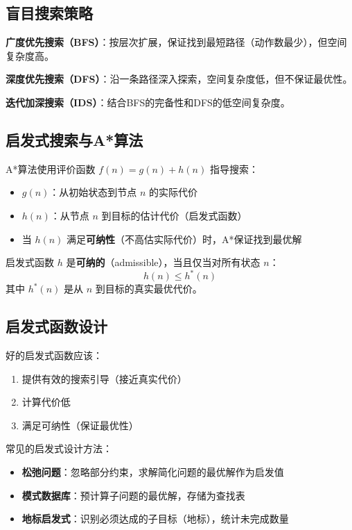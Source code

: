 \subsection{盲目搜索策略}

\textbf{广度优先搜索（BFS）}：按层次扩展，保证找到最短路径（动作数最少），但空间复杂度高。

\textbf{深度优先搜索（DFS）}：沿一条路径深入探索，空间复杂度低，但不保证最优性。

\textbf{迭代加深搜索（IDS）}：结合BFS的完备性和DFS的低空间复杂度。

\subsection{启发式搜索与A*算法}

\begin{keypoint}[A*算法核心思想]
A*算法使用评价函数 $f(n) = g(n) + h(n)$ 指导搜索：
\begin{itemize}
  \item $g(n)$：从初始状态到节点 $n$ 的实际代价
  \item $h(n)$：从节点 $n$ 到目标的估计代价（启发式函数）
  \item 当 $h(n)$ 满足\textbf{可纳性}（不高估实际代价）时，A*保证找到最优解
\end{itemize}
\end{keypoint}

\begin{definition}[可纳启发式]
启发式函数 $h$ 是\textbf{可纳的}（admissible），当且仅当对所有状态 $n$：
\[ h(n) \leq h^*(n) \]
其中 $h^*(n)$ 是从 $n$ 到目标的真实最优代价。
\end{definition}

\subsection{启发式函数设计}

好的启发式函数应该：
\begin{enumerate}[leftmargin=2em]
  \item 提供有效的搜索引导（接近真实代价）
  \item 计算代价低
  \item 满足可纳性（保证最优性）
\end{enumerate}

常见的启发式设计方法：
\begin{itemize}[leftmargin=2em]
  \item \textbf{松弛问题}：忽略部分约束，求解简化问题的最优解作为启发值
  \item \textbf{模式数据库}：预计算子问题的最优解，存储为查找表
  \item \textbf{地标启发式}：识别必须达成的子目标（地标），统计未完成数量
\end{itemize}

